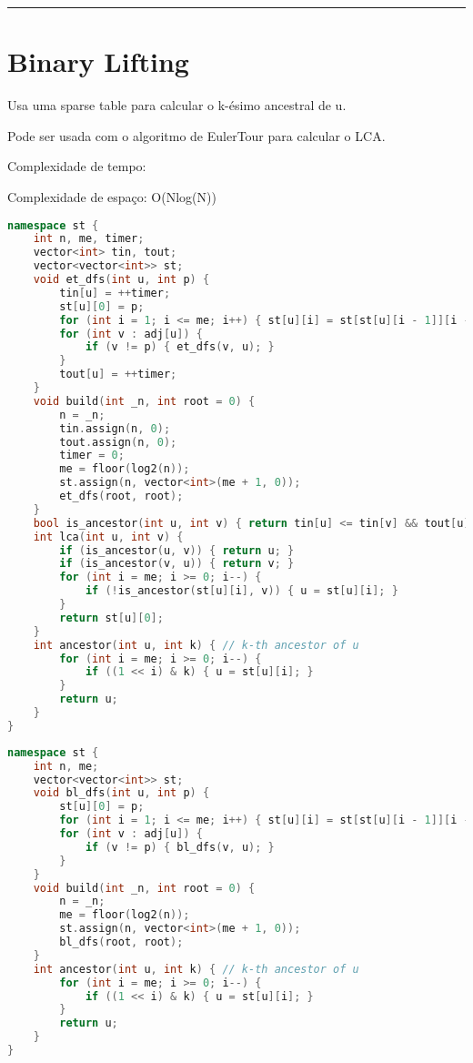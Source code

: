 \documentclass[11pt, a4paper, twoside]{book}
\begin{document}
\hfill

\rule{\textwidth}{0.4pt}

\section{Binary Lifting}



Usa uma sparse table para calcular o k-ésimo ancestral de u.



Pode ser usada com o algoritmo de EulerTour para calcular o LCA.



Complexidade de tempo:





Complexidade de espaço: O(Nlog(N))


\hfill

\begin{lstlisting}[language=C++]
namespace st {
    int n, me, timer;
    vector<int> tin, tout;
    vector<vector<int>> st;
    void et_dfs(int u, int p) {
        tin[u] = ++timer;
        st[u][0] = p;
        for (int i = 1; i <= me; i++) { st[u][i] = st[st[u][i - 1]][i - 1]; }
        for (int v : adj[u]) {
            if (v != p) { et_dfs(v, u); }
        }
        tout[u] = ++timer;
    }
    void build(int _n, int root = 0) {
        n = _n;
        tin.assign(n, 0);
        tout.assign(n, 0);
        timer = 0;
        me = floor(log2(n));
        st.assign(n, vector<int>(me + 1, 0));
        et_dfs(root, root);
    }
    bool is_ancestor(int u, int v) { return tin[u] <= tin[v] && tout[u] >= tout[v]; }
    int lca(int u, int v) {
        if (is_ancestor(u, v)) { return u; }
        if (is_ancestor(v, u)) { return v; }
        for (int i = me; i >= 0; i--) {
            if (!is_ancestor(st[u][i], v)) { u = st[u][i]; }
        }
        return st[u][0];
    }
    int ancestor(int u, int k) { // k-th ancestor of u
        for (int i = me; i >= 0; i--) {
            if ((1 << i) & k) { u = st[u][i]; }
        }
        return u;
    }
}
\end{lstlisting}

\hfill

\begin{lstlisting}[language=C++]
namespace st {
    int n, me;
    vector<vector<int>> st;
    void bl_dfs(int u, int p) {
        st[u][0] = p;
        for (int i = 1; i <= me; i++) { st[u][i] = st[st[u][i - 1]][i - 1]; }
        for (int v : adj[u]) {
            if (v != p) { bl_dfs(v, u); }
        }
    }
    void build(int _n, int root = 0) {
        n = _n;
        me = floor(log2(n));
        st.assign(n, vector<int>(me + 1, 0));
        bl_dfs(root, root);
    }
    int ancestor(int u, int k) { // k-th ancestor of u
        for (int i = me; i >= 0; i--) {
            if ((1 << i) & k) { u = st[u][i]; }
        }
        return u;
    }
}
\end{lstlisting}
\end{document}
